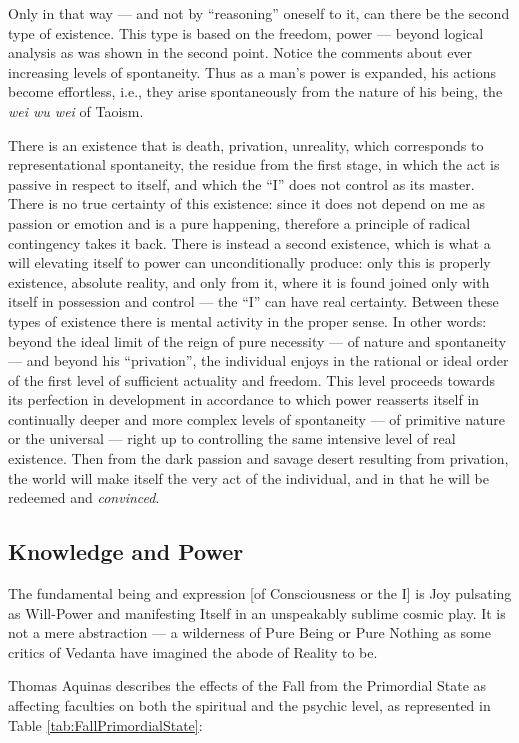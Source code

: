 Only in that way --- and not by ``reasoning'' oneself to it, can there be the second type of existence. This type is based on the freedom, power --- beyond logical analysis as was shown in the second point. Notice the comments about ever increasing levels of spontaneity. Thus as a man's power is expanded, his actions become effortless, i.e., they arise spontaneously from the nature of his being, the \emph{wei wu wei} of Taoism.

\begin{quotex}
There is an existence that is death, privation, unreality, which corresponds to representational spontaneity, the residue from the first stage, in which the act is passive in respect to itself, and which the ``I'' does not control as its master. There is no true certainty of this existence: since it does not depend on me as passion or emotion and is a pure happening, therefore a principle of radical contingency takes it back. There is instead a second existence, which is what a will elevating itself to power can unconditionally produce: only this is properly existence, absolute reality, and only from it, where it is found joined only with itself in possession and control --- the ``I'' can have real certainty. Between these types of existence there is mental activity in the proper sense. In other words: beyond the ideal limit of the reign of pure necessity --- of nature and spontaneity --- and beyond his ``privation'', the individual enjoys in the rational or ideal order of the first level of sufficient actuality and freedom. This level proceeds towards its perfection in development in accordance to which power reasserts itself in continually deeper and more complex levels of spontaneity --- of primitive nature or the universal --- right up to controlling the same intensive level of real existence. Then from the dark passion and savage desert resulting from privation, the world will make itself the very act of the individual, and in that he will be redeemed and \emph{convinced}.
\end{quotex}

\subsection*{Knowledge and Power}

\begin{quotex}
The fundamental being and expression [of Consciousness or the I] is Joy pulsating as Will-Power and manifesting Itself in an unspeakably sublime cosmic play. It is not a mere abstraction — a wilderness of Pure Being or Pure Nothing as some critics of Vedanta have imagined the abode of Reality to be. 

\end{quotex}
Thomas Aquinas describes the effects of the Fall from the Primordial State as affecting faculties on both the spiritual and the psychic level, as represented in Table \ref{tab:FallPrimordialState}:


